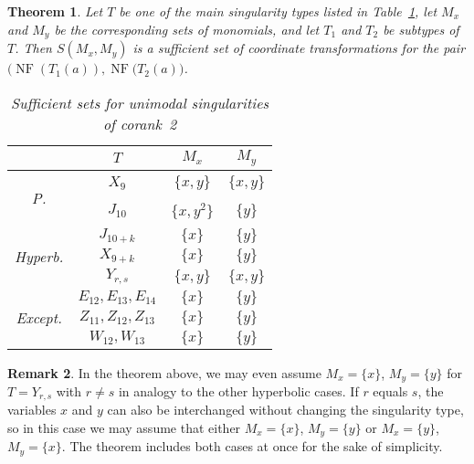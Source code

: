 \documentclass[noend]{amsproc}
\newtheorem{theorem}{Theorem}
\theoremstyle{definition}
\newtheorem{remark}[theorem]{Remark}
\DeclareMathOperator{\NF}{NF}
\begin{document}
\begin{theorem}\label{thm:sufficient_sets}
Let $T$ be one of the main singularity types listed in
Table~\ref{tab:sufficient_sets}, let $M_x$ and $M_y$ be the corresponding sets
of monomials, and let $T_1$ and $T_2$ be subtypes of $T$. Then $S(M_x, M_y)$
is a sufficient set of coordinate transformations for the pair
$\bigl(\NF(T_1(a)), \NF(T_2(a)\bigr)$.

\begin{table}[htb]
\centering
\caption{Sufficient sets for unimodal singularities of corank~2}
\label{tab:sufficient_sets}
\begin{tabular}{|c|c|c|c|}
\hline

& $T$ & $M_x$ & $M_y$ \\
\hline\hline


\multirow{2}{*}{\begin{sideways}P.\end{sideways}}

& $X_9$    & $\{x, y\}$   & $\{x, y\}$ \\ \cline{2-4}
& $J_{10}$ & $\{x, y^2\}$ & $\{y\}$    \\ \hline


\multirow{3}{*}{\begin{sideways}Hyperb.\end{sideways}}

& $J_{10+k}$ & $\{x\}$    & $\{y\}$    \\ \cline{2-4}
& $X_{9+k}$  & $\{x\}$    & $\{y\}$    \\ \cline{2-4}
& $Y_{r,s}$  & $\{x, y\}$ & $\{x, y\}$ \\ \hline


\multirow{3}{*}{\begin{sideways}Except.\end{sideways}}

& $E_{12}, E_{13}, E_{14}$ & $\{x\}$ & $\{y\}$ \\ \cline{2-4}
& $Z_{11}, Z_{12}, Z_{13}$ & $\{x\}$ & $\{y\}$ \\ \cline{2-4}
& $W_{12}, W_{13}$         & $\{x\}$ & $\{y\}$ \\ \hline

\end{tabular}
\end{table}

\end{theorem}

\begin{remark}\label{rem:sufficient_sets_Yrs}
In the theorem above, we may even assume $M_x = \{x\}$, $M_y = \{y\}$ for
$T = Y_{r,s}$ with $r \neq s$ in analogy to the other hyperbolic cases. If $r$
equals $s$, the variables $x$ and $y$ can also be interchanged without changing
the singularity type, so in this case we may assume that either $M_x = \{x\}$,
$M_y = \{y\}$ or $M_x = \{y\}$, $M_y = \{x\}$. The theorem includes both cases
at once for the sake of simplicity.
\end{remark}
\end{document}
